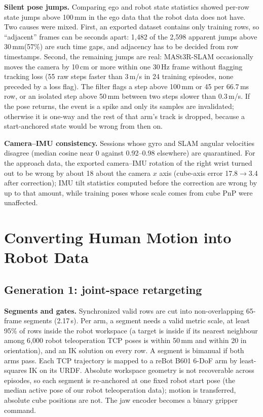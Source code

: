 \documentclass[conference,10pt]{IEEEtran}
\newcommand{\mm}{\,mm\xspace}
\begin{document}
\textbf{Silent pose jumps.} Comparing ego and robot state statistics showed per-row state jumps above 100\mm in the ego data that
the robot data does not have. Two causes were mixed. First, an exported dataset contains only training rows, so ``adjacent''
frames can be seconds apart: 1{,}482 of the 2{,}598 apparent jumps above 30\mm (57\%) are such time gaps, and adjacency has to be
decided from row timestamps. Second, the remaining jumps are real: MASt3R-SLAM occasionally moves the camera by 10\,cm or more
within one 30\,Hz frame without flagging tracking loss (55 raw steps faster than 3\,m/s in 24 training episodes, none preceded by
a loss flag). The filter flags a step above 100\mm or 45\textdegree{} per 66.7\,ms row, or an isolated step above 50\mm between two
steps slower than 0.3\,m/s. If the pose returns, the event is a spike and only its samples are invalidated; otherwise it is one-way
and the rest of that arm's track is dropped, because a start-anchored state would be wrong from then on.

\textbf{Camera--IMU consistency.} Sessions whose gyro and SLAM angular velocities disagree (median cosine near 0 against
0.92--0.98 elsewhere) are quarantined. For the approach data, the exported camera--IMU rotation of the right wrist turned out to be
wrong by about 18\textdegree{} about the camera $x$ axis (cube-axis error 17.8$\to$3.4\textdegree{} after correction); IMU tilt
statistics computed before the correction are wrong by up to that amount, while training poses whose scale comes from cube PnP
were unaffected.

\section{Converting Human Motion into Robot Data}\label{sec:conv}
\subsection{Generation 1: joint-space retargeting}
\textbf{Segments and gates.} Synchronized valid rows are cut into non-overlapping 65-frame segments (2.17\,s). Per arm, a segment
needs a valid metric scale, at least 95\% of rows inside the robot workspace (a target is inside if its nearest neighbour among
6{,}000 robot teleoperation TCP poses is within 50\mm and within 20\textdegree{} in orientation), and an IK solution on every row.
A segment is bimanual if both arms pass. Each TCP trajectory is mapped to a reBot B601 6-DoF arm by least-squares IK on its URDF.
Absolute workspace geometry is not recoverable across episodes, so each segment is re-anchored at one fixed robot start pose (the
median active pose of our robot teleoperation data); motion is transferred, absolute cube positions are not. The jaw encoder
becomes a binary gripper command.
\end{document}
